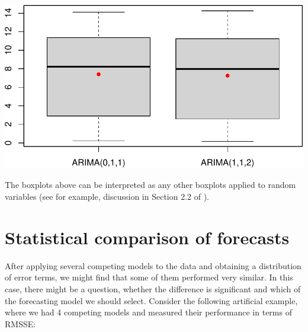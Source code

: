 \documentclass[
]{book}
\newenvironment{Shaded}{\begin{snugshade}}{\end{snugshade}}
\newcommand{\AttributeTok}[1]{\textcolor[rgb]{0.77,0.63,0.00}{#1}}
\newcommand{\DecValTok}[1]{\textcolor[rgb]{0.00,0.00,0.81}{#1}}
\newcommand{\FunctionTok}[1]{\textcolor[rgb]{0.00,0.00,0.00}{#1}}
\newcommand{\NormalTok}[1]{#1}
\newcommand{\OtherTok}[1]{\textcolor[rgb]{0.56,0.35,0.01}{#1}}
\newcommand{\SpecialCharTok}[1]{\textcolor[rgb]{0.00,0.00,0.00}{#1}}
\newcommand{\StringTok}[1]{\textcolor[rgb]{0.31,0.60,0.02}{#1}}
\theoremstyle{definition}
\theoremstyle{definition}
\theoremstyle{definition}
\theoremstyle{definition}
\theoremstyle{remark}
\begin{document}
\begin{Shaded}
\end{Shaded}

\includegraphics{adam_files/figure-latex/unnamed-chunk-14-1.pdf}

The boxplots above can be interpreted as any other boxplots applied to random variables (see for example, discussion in Section 2.2 of \citet{SvetunkovSBA}).

\hypertarget{statisticalTests}{%
\section{Statistical comparison of forecasts}\label{statisticalTests}}

After applying several competing models to the data and obtaining a distribution of error terms, we might find that some of them performed very similar. In this case, there might be a question, whether the difference is significant and which of the forecasting model we should select. Consider the following artificial example, where we had 4 competing models and measured their performance in terms of RMSSE:
\end{document}
